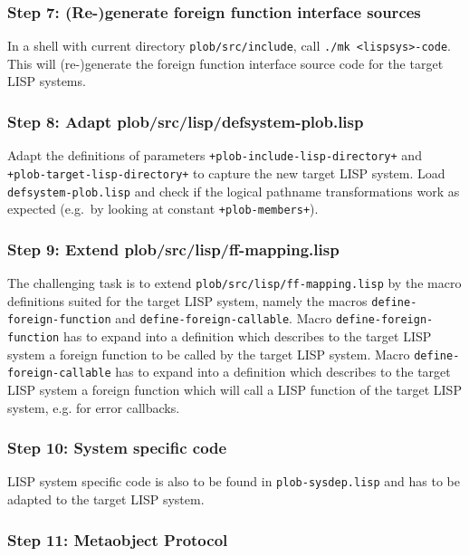 \subsubsection{Step 7: (Re-)generate foreign function interface sources}

In a shell with current directory \texttt{plob/src/include}, call
\texttt{./mk <lispsys>-code}. This will (re-)generate the foreign function
interface source code for the target LISP systems.

\subsubsection{Step 8: Adapt plob/src/lisp/defsystem-plob.lisp}

Adapt the definitions of parameters
\texttt{+plob-include-lisp-directory+} and
\texttt{+plob-target-lisp-directory+} to capture the new target LISP
system. Load \texttt{defsystem-plob.lisp} and check if the logical
pathname transformations work as expected (e.g.\ by looking at
constant \texttt{+plob-members+}).

\subsubsection{Step 9: Extend plob/src/lisp/ff-mapping.lisp}

The challenging task is to extend
\texttt{plob/src/lisp/ff-mapping.lisp} by the macro definitions suited
for the target LISP system, namely the macros
\texttt{define-foreign-function} and \texttt{define-foreign-callable}.
Macro \texttt{define-foreign-function} has to expand into a definition
which describes to the target LISP system a foreign function to be
called by the target LISP system.  Macro
\texttt{define-foreign-callable} has to expand into a definition which
describes to the target LISP system a foreign function which will call
a LISP function of the target LISP system, e.g. for error callbacks.

\subsubsection{Step 10: System specific code}

LISP system specific code is also to be found in
\texttt{plob-sysdep.lisp} and has to be adapted to the target LISP
system.

\subsubsection{Step 11: Metaobject Protocol}

